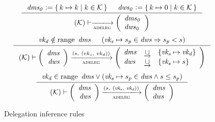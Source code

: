 \begin{figure}[htb]
  \begin{equation}
    \label{eq:adeleg-bootstrap}
    \inference
    {
      \var{dms_0} \leteq \Set{k \mapsto k}{k \in \mathcal{K}} &
      \var{dws_0} \leteq \Set{k \mapsto 0}{k \in \mathcal{K}}
    }
    {
      \left(
        \mathcal{K}
      \right)
      \vdash
      \trans{adeleg}{}
      \left(
        \begin{array}{l}
          \var{dms_0}\\
          \var{dws_0}
        \end{array}
      \right)
    }
  \end{equation}
  \nextdef
  \begin{equation}\label{eq:rule:delegation-change}
    \inference
    {
      \var{vk_d} \notin \range~\var{dms} & (\var{vk_s} \mapsto s_p \in \var{dws} \Rightarrow s_p < s)
    }
    {
      \left(\mathcal{K}\right)
      \vdash
      \left(
      \begin{array}{r}
        \var{dms}\\
        \var{dws}
      \end{array}
      \right)
      \trans{adeleg}{(s,~ (vk_s,~ vk_d))}
      \left(
      \begin{array}{lcl}
        \var{dms} & \unionoverrideRight & \{\var{vk_s} \mapsto \var{vk_d}\}\\
        \var{dws} & \unionoverrideRight & \{\var{vk_s} \mapsto s \}
      \end{array}
      \right)
    }
  \end{equation}
  \nextdef
  \begin{equation}\label{eq:rule:delegation-nop}
    \inference
    {\var{vk_d} \in \range~\var{dms} \vee (\var{vk_s} \mapsto s_p  \in \var{dws}  \wedge s \leq s_p)
    }
    {
      \left(\mathcal{K}\right)
      \vdash
      \left(
      \begin{array}{r}
        \var{dms}\\
        \var{dws}
      \end{array}
      \right)
      \trans{adeleg}{(s,~ (\var{vk_s},~ \var{vk_d}))}
      \left(
      \begin{array}{lcl}
        \var{dms}\\
        \var{dws}
      \end{array}
      \right)
    }
  \end{equation}
  \caption{Delegation inference rules}
  \label{fig:rules:delegation}
\end{figure}

